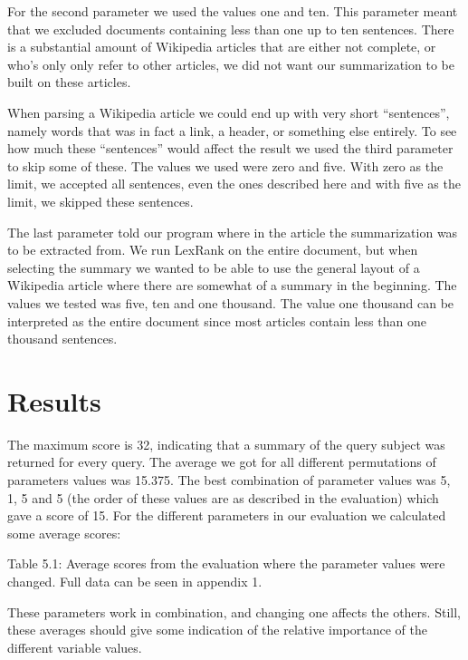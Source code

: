 \documentclass[10pt, a4paper]{article}
\begin{document}
For the second parameter we used the values one and ten. This parameter meant that we excluded documents containing less than one up to ten sentences. There is a substantial amount of Wikipedia articles that are either not complete, or who’s only only refer to other articles, we did not want our summarization to be built on these articles.

When parsing a Wikipedia article we could end up with very short “sentences”, namely words that was in fact a link, a header, or something else entirely. To see how much these “sentences” would affect the result we used the third parameter to skip some of these. The values we used were zero and five. With zero as the limit, we accepted all sentences, even the ones described here and with five as the limit, we skipped these sentences.

The last parameter told our program where in the article the summarization was to be extracted from. We run LexRank on the entire document, but when selecting the summary we wanted to be able to use the general layout of a Wikipedia article where there are somewhat of a summary in the beginning. The values we tested was five, ten and one thousand. The value one thousand can be interpreted as the entire document since most articles contain less than one thousand sentences.


\section{Results}
The maximum score is 32, indicating that a summary of the query subject was returned for every query. The average we got for all different permutations of parameters values was 15.375. The best combination of parameter values was 5, 1, 5 and 5 (the order of these values are as described in the evaluation) which gave a score of 15. For the different parameters in our evaluation we calculated some average scores:

Table 5.1: Average scores from the evaluation where the parameter values were changed. Full data can be seen in appendix 1.

These parameters work in combination, and changing one affects the others. Still, these averages should give some indication of the relative importance of the different variable values.
\end{document}
